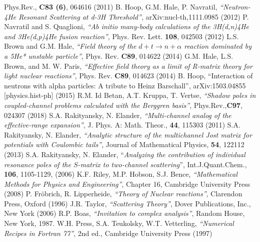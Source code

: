 \documentclass[12pt]{article}
\begin{document}
\begin{thebibliography}{99}
    Phys.Rev., {\bf C83 (6)}, 064616 (2011)
    B. Hoop, G.M. Hale, P. Navratil,
    {\it``Neutron-4He Resonant Scattering at d-3H Threshold''},
    arXiv:nucl-th,1111.0985 (2012)
    P. Navratil and S. Quaglioni,
    {\it ``Ab initio many-body calculations of the 3H(d,n)4He and 3He(d,p)4He fusion reaction''},
    Phys. Rev. Lett. {\bf 108}, 042503 (2012)
    L.S. Brown and G.M. Hale,
    {\it ``Field theory of the $d + t \to n + \alpha$ reaction dominated by a 
5He* unstable particle''},
    Phys. Rev. {\bf C89}, 014622 (2014)
    G.M. Hale, L.S. Brown, and M. W. Paris,
    {\it ``Effective field theory as a limit of R-matrix theory for light nuclear reactions''},
    Phys. Rev. {\bf C89}, 014623 (2014)
    B. Hoop,
    {``Interaction of neutrons with alpha particles: A tribute to Heinz Barschall''},
    arXiv:1503.04855 [physics.hist-ph] (2015)
        R.M. Id Betan, A.T. Kruppa, T. Vertse,
        {\it``Shadow poles in coupled-channel problems calculated with the
        Berggren basis''},
        Phys.Rev.,{\bf C97}, 024307 (2018)
        S.A. Rakityansky, N. Elander,
        {\it ``Multi-channel analog of the effective-range expansion''},
        J. Phys. A: Math. Theor., {\bf 44}, 115303 (2011)
        S.A. Rakityansky, N. Elander,
        {\it ``Analytic structure of the multichannel Jost matrix for potentials
        with Coulombic tails''},
        Journal of Mathematical Physics, {\bf 54}, 122112 (2013)
           S.A. Rakityansky, N. Elander,
           ``{\it Analyzing the contribution of individual resonance poles
            of the $S$-matrix to two-channel scattering}'',
            Int.J.Quant.Chem., {\bf 106}, 1105-1129, (2006)
	K.F. Riley,‎ M.P. Hobson,‎ S.J. Bence,
	{\it ``Mathematical Methods for Physics and Engineering''},
	Chapter 16,
	Cambridge University Press (2008)
       P. Fr\"obrich, R. Lipperheide,
       {\it ``Theory of Nuclear reactions''},
       Clarendon Press, Oxford (1996)
      J.R. Taylor,
      {\it ``Scattering Theory''},
      Dover Publications, Inc., New York (2006)
 R.P. Boas, {\it ``Invitation to complex analysis''},
                     Random House, New York, 1987.
	W.H. Press, S.A. Teukolsky, W.T. Vetterling,
	{\it ``Numerical Recipes in Fortran 77''},
	2nd ed., Cambridge University Press (1997)

\end{thebibliography}
\end{document}
